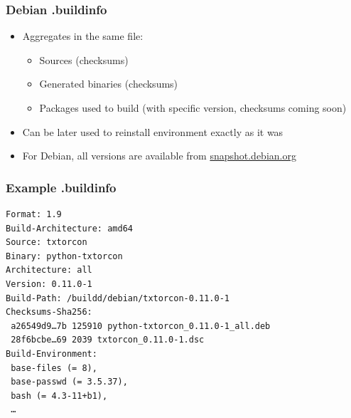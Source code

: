 \documentclass[14pt]{beamer}
\begin{document}
\begin{frame}
 \frametitle{Debian .buildinfo}

 \begin{itemize}
  \item Aggregates in the same file:
   \begin{itemize}
    \item Sources (checksums)
    \item Generated binaries (checksums)
    \item Packages used to build (with specific version, checksums coming soon)
   \end{itemize}
  \item Can be later used to reinstall environment exactly as it was
  \item For Debian, all versions are available from \url{snapshot.debian.org}
 \end{itemize}
\end{frame}


\begin{frame}[fragile]
 \frametitle{Example .buildinfo}

{\small
\begin{verbatim}
Format: 1.9
Build-Architecture: amd64
Source: txtorcon
Binary: python-txtorcon
Architecture: all
Version: 0.11.0-1
Build-Path: /buildd/debian/txtorcon-0.11.0-1
Checksums-Sha256:
 a26549d9…7b 125910 python-txtorcon_0.11.0-1_all.deb
 28f6bcbe…69 2039 txtorcon_0.11.0-1.dsc
Build-Environment:
 base-files (= 8),
 base-passwd (= 3.5.37),
 bash (= 4.3-11+b1),
 …
\end{verbatim}
}
\end{frame}
\end{document}
